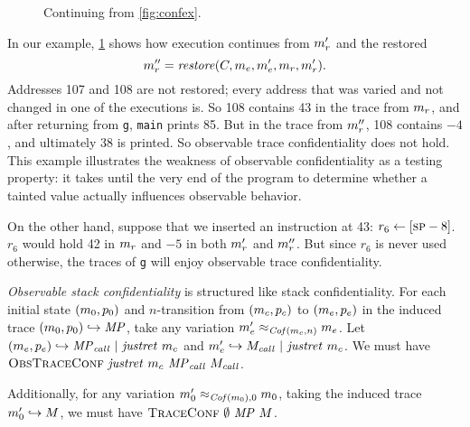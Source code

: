 \documentclass[acmsmall,review,anonymous]{acmart}\settopmatter{printfolios=true,printccs=false,printacmref=false}
\begin{document}
{{      \begin{figure}
        \confidentialitylazyexample
        \caption{Continuing from \cref{fig:confex}.}
        \label{fig:conflex}
      \end{figure}

      In our example, \cref{fig:conflex} shows how execution continues from
      \(m_r'\) and the restored
      \[m_r'' = \mathit{restore}(C,
      m_e,m_e',m_r,m_r').
      \]
      Addresses 107 and 108
      are not restored; every address that was varied and not changed in one
      of the executions is. So 108 contains 43 in the trace from \(m_r\),
      and after returning from {\tt g}, {\tt main} prints 85. But in the trace
      from \(m_r''\), 108 contains $-4$, and ultimately 38 is printed.
      So observable trace confidentiality does not hold. This example
      illustrates the weakness of observable confidentiality as a testing
      property: it takes until the very end of the program to determine whether
      a tainted value actually influences observable behavior.

      On the other hand, suppose that we inserted an instruction at 43:
      \(r_6 \leftarrow [\textsc{sp}-8]\). \(r_6\) would hold 42 in \(m_r\)
      and $-5$ in both \(m_r'\) and \(m_r''\). But since \(r_6\) is
      never used otherwise, the traces of {\tt g} will enjoy observable trace
      confidentiality.


      {\em Observable stack confidentiality} is structured like stack
      confidentiality. For each initial
      state \((m_0, p_0)\) and \(n\)-transition from \((m_c,p_c)\)
      to \((m_e,p_e)\) in the induced trace
      \((m_0,p_0) \hookrightarrow \mathit{MP}\), take any
      variation \(m_e' \approx_{\mathit{Cof}(m_c,n)} m_e\). Let
      \((m_e,p_e) \hookrightarrow \mathit{MP}_{\mathit{call}} ~ | ~
      \mathit{justret}\ m_c\) and \(m_e' \hookrightarrow M_{\mathit{call}} ~ | ~
      \mathit{justret}\ m_c\). We must have \(\text{\sc ObsTraceConf} ~
      \mathit{justret}\ m_c ~ \mathit{MP}_{\mathit{call}} ~ M_{\mathit{call}}\).

      Additionally, for any variation \(m_0' \approx_{\mathit{Cof}(m_0),0}
      m_0\), taking the induced trace  \(m_0' \hookrightarrow
      M\), we must have \(\text{\sc TraceConf} ~ \emptyset ~ \mathit{MP} ~ M\).

}}
\end{document}
